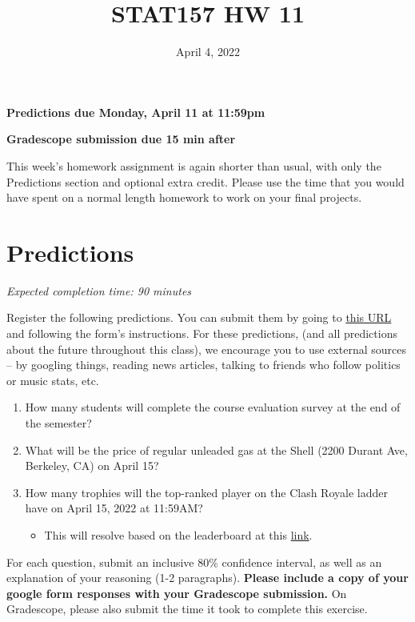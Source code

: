 \documentclass[11pt]{article}
\title{STAT157 HW 11}
\date{April 4, 2022}
\begin{document}
\maketitle

\hfill \textbf{Predictions due Monday, April 11 at 11:59pm}

\hfill \textbf{Gradescope submission due 15 min after}

This week's homework assignment is again shorter than usual, with only the Predictions section and optional extra credit. Please use the time that you would have spent on a normal length homework to work on your final projects.


\section*{Predictions}

\emph{Expected completion time: 90 minutes}

Register the following predictions. You can submit them by going to \href{https://docs.google.com/forms/d/e/1FAIpQLSeuAvwFjD2S2yk5mdsHn0MbgeOUwpt3Pr4TwNLLFA86mfaxHQ/viewform?usp=sf_link}{this URL} and following the form's instructions. For these predictions, (and all predictions about the future throughout this class), we encourage you to use external sources -- by googling things, reading news articles, talking to friends who follow politics or music stats, etc.

\begin{enumerate}
	\item How many students will complete the course evaluation survey at the end of the semester?
	\item What will be the price of regular unleaded gas at the Shell (2200 Durant Ave, Berkeley, CA) on April 15?
	\item How many trophies will the top-ranked player on the Clash Royale ladder have on April 15, 2022 at 11:59AM?
	\begin{itemize}
		\item This will resolve based on the leaderboard at this \href{https://statsroyale.com/top/players}{link}.
	\end{itemize}
\end{enumerate}

For each question, submit an inclusive 80\% confidence interval, as well as an explanation of your reasoning (1-2 paragraphs). \textbf{Please include a copy of your google form responses with your Gradescope submission.} On Gradescope, please also submit the time it took to complete this exercise.
\end{document}
